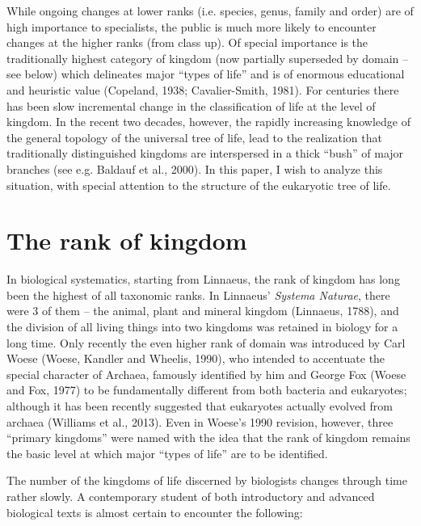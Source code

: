 \begin{artengenv}
While ongoing changes at lower ranks (i.e. species, genus, family and order) are of high importance to specialists, the
public is much more likely to encounter changes at the higher ranks (from class up). Of special importance is the
traditionally highest category of kingdom (now partially superseded by domain – see below) which delineates major
“types of life” and is of enormous educational and heuristic value \label{ref:RND3zNGphpm9n}(Copeland, 1938;
Cavalier-Smith, 1981). For centuries there has been slow incremental change in the classification of life at the level
of kingdom. In the recent two decades, however, the rapidly increasing knowledge of the general topology of the
universal tree of life, lead to the realization that traditionally distinguished kingdoms are interspersed in a thick
“bush” of major branches \label{ref:RNDASUVezikg7}(see e.g. Baldauf et al., 2000). In this paper, I wish to analyze
this situation, with special attention to the structure of the eukaryotic tree of life. 

\section{The rank of kingdom}

In biological systematics, starting from Linnaeus, the rank of kingdom has long been the highest of all taxonomic ranks.
In Linnaeus’ \textit{Systema Naturae}, there were 3 of them – the animal, plant and mineral kingdom
\label{ref:RND6bXO1caZ3A}(Linnaeus, 1788), and the division of all living things into two kingdoms was retained in
biology for a long time. Only recently the even higher rank of domain was introduced by Carl Woese
\label{ref:RNDDiuS3oKKqs}(Woese, Kandler and Wheelis, 1990), who intended to accentuate the special character of
Archaea, famously identified by him and George Fox \label{ref:RNDIQY6gpSHPx}(Woese and Fox, 1977) to be fundamentally
different from both bacteria and eukaryotes; although it has been recently suggested that eukaryotes actually evolved
from archaea \label{ref:RND5ULE3HHm08}(Williams et al., 2013). Even in Woese’s 1990 revision, however, three “primary
kingdoms” were named with the idea that the rank of kingdom remains the basic level at which major “types of life” are
to be identified.

The number of the kingdoms of life discerned by biologists changes through time rather slowly. A contemporary student of
both introductory and advanced biological texts is almost certain to encounter the following:


\end{artengenv}
